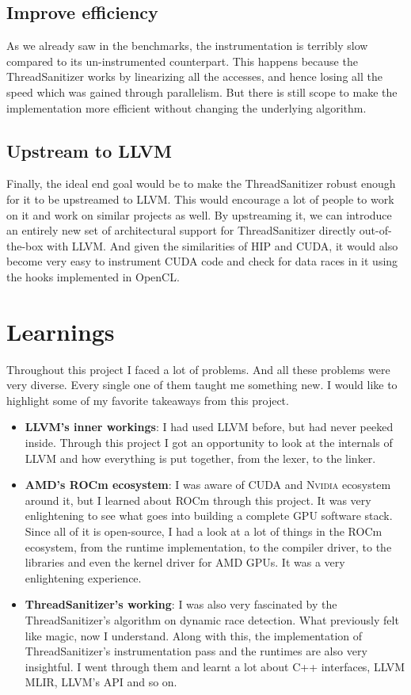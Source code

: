 \documentclass{btp}
\begin{document}
\subsection{Improve efficiency}

As we already saw in the benchmarks, the instrumentation is terribly slow compared to its un-instrumented counterpart. This happens because the ThreadSanitizer works by linearizing all the accesses, and hence losing all the speed which was gained through parallelism. But there is still scope to make the implementation more efficient without changing the underlying algorithm.

\subsection{Upstream to LLVM}

Finally, the ideal end goal would be to make the ThreadSanitizer robust enough for it to be upstreamed to LLVM. This would encourage a lot of people to work on it and work on similar projects as well. By upstreaming it, we can introduce an entirely new set of architectural support for ThreadSanitizer directly out-of-the-box with LLVM. And given the similarities of HIP and CUDA, it would also become very easy to instrument CUDA code and check for data races in it using the hooks implemented in OpenCL.

\section{Learnings}

Throughout this project I faced a lot of problems. And all these problems were very diverse. Every single one of them taught me something new. I would like to highlight some of my favorite takeaways from this project.

\begin{itemize}
	\item \textbf{LLVM's inner workings}: I had used LLVM before, but had never peeked inside. Through this project I got an opportunity to look at the internals of LLVM and how everything is put together, from the lexer, to the linker.
	\item \textbf{AMD's ROCm ecosystem}: I was aware of CUDA and \textsc{Nvidia} ecosystem around it, but I learned about ROCm through this project. It was very enlightening to see what goes into building a complete GPU software stack. Since all of it is open-source, I had a look at a lot of things in the ROCm ecosystem, from the runtime implementation, to the compiler driver, to the libraries and even the kernel driver for AMD GPUs. It was a very enlightening experience.
	\item \textbf{ThreadSanitizer's working}: I was also very fascinated by the ThreadSanitizer's algorithm on dynamic race detection. What previously felt like magic, now I understand. Along with this, the implementation of ThreadSanitizer's instrumentation pass and the runtimes are also very insightful. I went through them and learnt a lot about C++ interfaces, LLVM MLIR, LLVM's API and so on.
\end{itemize}
\end{document}
